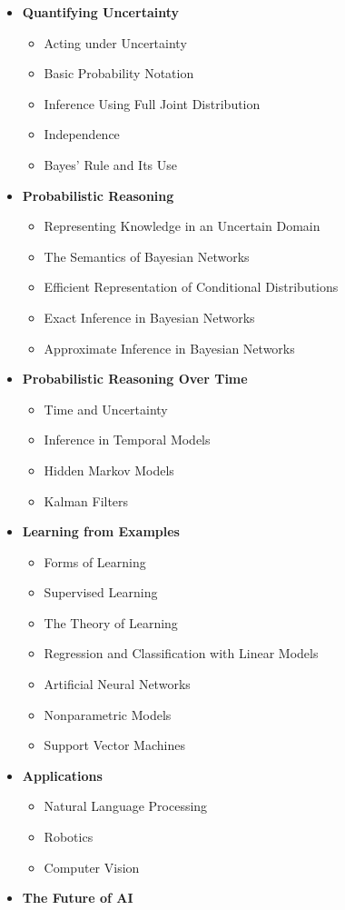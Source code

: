 \documentclass{article}
\begin{document}
\begin{itemize}
  \item \textbf{Quantifying Uncertainty}
    \begin{itemize}
      \item Acting under Uncertainty
      \item Basic Probability Notation
      \item Inference Using Full Joint Distribution
      \item Independence
      \item Bayes' Rule and Its Use
    \end{itemize}

  \item \textbf{Probabilistic Reasoning}
    \begin{itemize}
      \item Representing Knowledge in an Uncertain Domain
      \item The Semantics of Bayesian Networks
      \item Efficient Representation of Conditional Distributions
      \item Exact Inference in Bayesian Networks
      \item Approximate Inference in Bayesian Networks
    \end{itemize}

  \item \textbf{Probabilistic Reasoning Over Time}
    \begin{itemize}
      \item Time and Uncertainty
      \item Inference in Temporal Models
      \item Hidden Markov Models
      \item Kalman Filters
    \end{itemize}

  \item \textbf{Learning from Examples}
    \begin{itemize}
      \item Forms of Learning
      \item Supervised Learning
      \item The Theory of Learning
      \item Regression and Classification with Linear Models
      \item Artificial Neural Networks
      \item Nonparametric Models
      \item Support Vector Machines
    \end{itemize}

  \item \textbf{Applications}
    \begin{itemize}
      \item Natural Language Processing
      \item Robotics
      \item Computer Vision
    \end{itemize}

  \item \textbf{The Future of AI}
\end{itemize}
\end{document}
